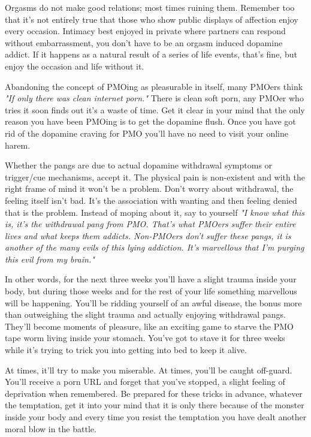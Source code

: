 \documentclass[easypeasy.tex]{subfiles}
\begin{document}
Orgasms do not make good relations; most times ruining them. Remember too that it's not entirely true that those who show public displays of affection enjoy every occasion. Intimacy best enjoyed in private where partners can respond without embarrassment, you don't have to be an orgasm induced dopamine addict. If it happens as a natural result of a series of life events, that's fine, but enjoy the occasion and life without it.

Abandoning the concept of PMOing as pleasurable in itself, many PMOers think \textit{"If only there was clean internet porn."} There is clean soft porn, any PMOer who tries it soon finds out it's a waste of time. Get it clear in your mind that the only reason you have been PMOing is to get the dopamine flush. Once you have got rid of the dopamine craving for PMO you'll have no need to visit your online harem.

Whether the pangs are due to actual dopamine withdrawal symptoms or trigger/cue mechanisms, accept it. The physical pain is non-existent and with the right frame of mind it won't be a problem. Don't worry about withdrawal, the feeling itself isn't bad. It's the association with wanting and then feeling denied that is the problem. Instead of moping about it, say to yourself \textit{"I know what this is, it's the withdrawal pang from PMO. That's what PMOers suffer their entire lives and what keeps them addicts. Non-PMOers don't suffer these pangs, it is another of the many evils of this lying addiction. It's marvellous that I'm purging this evil from my brain."}

In other words, for the next three weeks you'll have a slight trauma inside your body, but during those weeks and for the rest of your life something marvellous will be happening. You'll be ridding yourself of an awful disease, the bonus more than outweighing the slight trauma and actually enjoying withdrawal pangs. They'll become moments of pleasure, like an exciting game to starve the PMO tape worm living inside your stomach. You've got to stave it for three weeks while it's trying to trick you into getting into bed to keep it alive.

At times, it'll try to make you miserable. At times, you'll be caught off-guard. You'll receive a porn URL and forget that you've stopped, a slight feeling of deprivation when remembered. Be prepared for these tricks in advance, whatever the temptation, get it into your mind that it is only there because of the monster inside your body and every time you resist the temptation you have dealt another moral blow in the battle.
\end{document}
